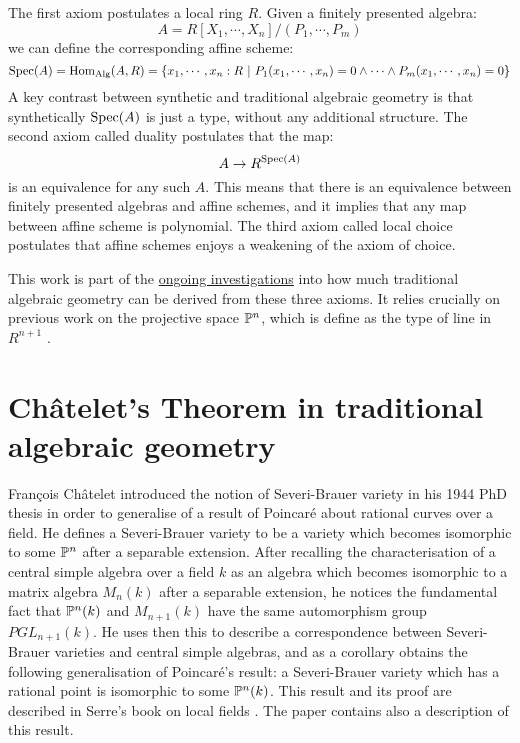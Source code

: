 \documentclass{../util/zariski}
\begin{document}
The first axiom postulates a local ring $R$. Given a finitely presented algebra:
\[A = R[X_1,\cdots,X_n]/(P_1,\cdots,P_m)\]
we can define the corresponding affine scheme:
\[\operatorname{Spec}(A) = \mathrm{Hom}_{\mathrm{Alg}}(A,R) = \{x_1,\cdots,x_n:R\ |\ P_1(x_1,\cdots,x_n) = 0 \land\cdots\land P_m(x_1,\cdots,x_n) = 0\}\] 
A key contrast between synthetic and traditional algebraic geometry is that synthetically $\operatorname{Spec}(A)$ is just a type, without any additional structure. The second axiom called duality postulates that the map:
\[A\to R^{\operatorname{Spec}(A)}\]
is an equivalence for any such $A$. This means that there is an equivalence between finitely presented algebras and affine schemes, and it implies that any map between affine scheme is polynomial. The third axiom called local choice postulates that affine schemes enjoys a weakening of the axiom of choice.

This work is part of the \href{https://github.com/felixwellen/synthetic-zariski/blob/main/README.md}{ongoing investigations} into how much traditional algebraic geometry can be derived from these three axioms. It relies crucially on previous work on the projective space $\mathbb{P}^n$, which is define as the type of line in $R^{n+1}$ \cite{sag-projective}.


\section{Ch\^atelet's Theorem in traditional algebraic geometry}

{F}ran\c cois {C}h\^atelet introduced the notion of Severi-Brauer variety in his 1944 PhD thesis
\cite{chatelet44} in order to generalise of a result of Poincar\'e about rational curves over a field.
He defines a Severi-Brauer variety to be a variety which becomes isomorphic to some $\mathbb{P}^n$ after
a separable extension. After recalling the characterisation of a central simple algebra over a field $k$ as
an algebra which becomes isomorphic to a matrix algebra $M_n(k)$ after a separable extension, he notices the fundamental
fact that $\mathbb{P}^{n}(k)$ and $M_{n+1}(k)$ have the same automorphism group $PGL_{n+1}(k)$. He uses then this
to describe a correspondence between Severi-Brauer varieties and central simple algebras, and as a corollary
obtains the following generalisation of Poincar\'e's result: a Severi-Brauer variety which has a rational point
is isomorphic to some $\mathbb{P}^{n}(k)$. This result and its proof are described in Serre's book on local fields \cite{serre62}.
The paper \cite{colliot88} contains also a description of this result.
\end{document}
